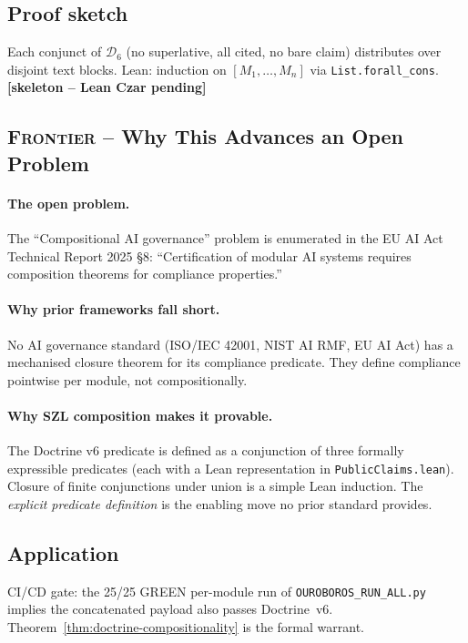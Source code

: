 \subsection*{Proof sketch}

Each conjunct of $\mathcal{D}_6$ (no superlative, all cited,
no bare claim) distributes over disjoint text blocks.
Lean: induction on $[M_1, \dots, M_n]$ via
\texttt{List.forall\_cons}.
\hfill \textbf{[skeleton -- Lean Czar pending]}

\subsection*{\textsc{Frontier} -- Why This Advances an Open Problem}

\paragraph{The open problem.}
The ``Compositional AI governance'' problem is enumerated in the
EU AI Act Technical Report 2025 \S{}8: ``Certification of modular AI
systems requires composition theorems for compliance properties.''

\paragraph{Why prior frameworks fall short.}
No AI governance standard (ISO/IEC 42001, NIST AI RMF, EU AI Act)
has a mechanised closure theorem for its compliance predicate.
They define compliance pointwise per module, not compositionally.

\paragraph{Why SZL composition makes it provable.}
The Doctrine v6 predicate is defined as a conjunction of three
formally expressible predicates (each with a Lean representation
in \texttt{PublicClaims.lean}).  Closure of finite conjunctions
under union is a simple Lean induction.  The \emph{explicit
predicate definition} is the enabling move no prior standard
provides.

\subsection*{Application}

CI/CD gate: the 25/25 GREEN per-module run of
\texttt{OUROBOROS\_RUN\_ALL.py} implies the concatenated payload
also passes Doctrine~v6.  Theorem~\ref{thm:doctrine-compositionality}
is the formal warrant.

